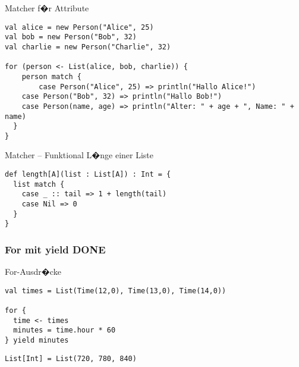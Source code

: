\documentclass[14pt,aspectratio=169,trans]{beamer} %
\begin{document}
\begin{frame}[fragile]{}
 \begin{block}{Matcher f�r Attribute}
\scriptsize
	\onslide<2->
  \begin{lstlisting}
val alice = new Person("Alice", 25)
val bob = new Person("Bob", 32)
val charlie = new Person("Charlie", 32)
   
for (person <- List(alice, bob, charlie)) {
	person match {
		case Person("Alice", 25) => println("Hallo Alice!")
    case Person("Bob", 32) => println("Hallo Bob!")
    case Person(name, age) => println("Alter: " + age + ", Name: " + name)
  }
}
	\end{lstlisting}
\end{block}
\end{frame}

\begin{frame}[fragile]{}
 \begin{block}{Matcher -- Funktional L�nge einer Liste}
\scriptsize
	\onslide<2->
  \begin{lstlisting}
def length[A](list : List[A]) : Int = {
  list match {
    case _ :: tail => 1 + length(tail)
    case Nil => 0
  }
}
	\end{lstlisting}
\end{block}
\end{frame}


\subsubsection*{For mit yield DONE}

\begin{frame}[fragile]{}
	\begin{block}{For-Ausdr�cke}
		\scriptsize
		\onslide<2->
  \begin{lstlisting}
val times = List(Time(12,0), Time(13,0), Time(14,0))

for {
  time <- times
  minutes = time.hour * 60
} yield minutes
	\end{lstlisting}
  \begin{lstlisting}[firstnumber = 7]
List[Int] = List(720, 780, 840)
	\end{lstlisting}
	\end{block}
	\note{}
\end{frame}
\end{document}
